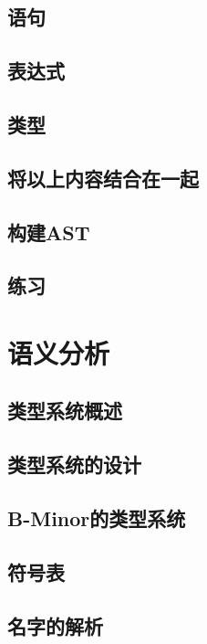 \documentclass[cn,11pt,chinese]{elegantbook}
\begin{document}
\section{语句}

\section{表达式}

\section{类型}

\section{将以上内容结合在一起}

\section{构建AST}

\section{练习}

\chapter{语义分析}

\section{类型系统概述}

\section{类型系统的设计}

\section{B-Minor的类型系统}

\section{符号表}

\section{名字的解析}
\end{document}
